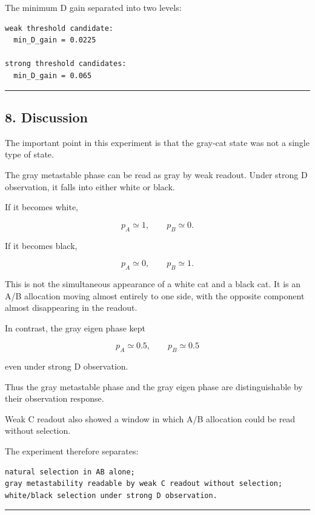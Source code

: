 \documentclass{article}
\begin{document}
The minimum D gain separated into two levels:

\begin{verbatim}
weak threshold candidate:
  min_D_gain = 0.0225

strong threshold candidates:
  min_D_gain = 0.065
\end{verbatim}

\begin{center}\rule{0.5\linewidth}{0.5pt}\end{center}

\subsection{8. Discussion}\label{discussion}

The important point in this experiment is that the gray-cat state was
not a single type of state.

The gray metastable phase can be read as gray by weak readout. Under
strong D observation, it falls into either white or black.

If it becomes white,

\[
p_A\simeq 1,\qquad p_B\simeq 0.
\]

If it becomes black,

\[
p_A\simeq 0,\qquad p_B\simeq 1.
\]

This is not the simultaneous appearance of a white cat and a black cat.
It is an A/B allocation moving almost entirely to one side, with the
opposite component almost disappearing in the readout.

In contrast, the gray eigen phase kept

\[
p_A\simeq 0.5,\qquad p_B\simeq 0.5
\]

even under strong D observation.

Thus the gray metastable phase and the gray eigen phase are
distinguishable by their observation response.

Weak C readout also showed a window in which A/B allocation could be
read without selection.

The experiment therefore separates:

\begin{verbatim}
natural selection in AB alone;
gray metastability readable by weak C readout without selection;
white/black selection under strong D observation.
\end{verbatim}

\begin{center}\rule{0.5\linewidth}{0.5pt}\end{center}
\end{document}

